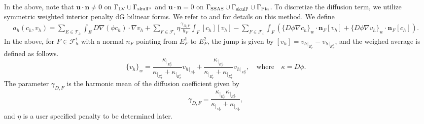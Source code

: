 \documentclass[fleqn,10pt]{wlscirep}
\begin{document}
In the above, note that $\bm u \cdot \bm n  \neq 0$ on $\Gamma_{\rm LV} \cup \Gamma_{\rm skull^u}$ and $\bm u \cdot \bm n = 0$ on $\Gamma_{\rm SSAS} \cup \Gamma_{\rm skull^l} \cup \Gamma_{\rm Pia}$. To discretize the diffusion term, we utilize symmetric weighted interior penalty dG bilinear forms. We refer to \cite{ern2009discontinuous} and \cite[Section 4.5.2.3]{di2011mathematical} for details on this method.  We define 
\begin{multline}
a_h (c_h, v_h) = \sum_{E \in \mathcal{T}_h } \int_{E} D \nabla (\phi c_h) \cdot \nabla v_h + \sum_{F \in \mathcal{F}_i} \eta \frac{\gamma_{D,F}}{h_F} \int_{F} [c_h][v_h] 
- \sum_{F \in \mathcal{F}_i} \int_{F} \left( \{D \phi \nabla c_h \}_w \cdot \bm n_F [v_h]  + \{D \phi\nabla v_h \}_w \cdot \bm n_F [c_h] \right).
 \nonumber
 \end{multline}
In the above, for $F\in \mathcal{F}_h^i$ with a normal $n_F$ pointing from $E_F^1$ to $E_F^2$,  the jump is given by $[v_h] = v_h{}_{\vert_{E_F^1}} - v_h{}_{\vert_{E_{F}^2}}$, and the weighed average is defined as follows.
\begin{equation}
\{v_h\}_{w} = \frac{ \kappa_{\vert_{E_F^2}}}{\kappa_{\vert_{E_F^1}}+ \kappa_{\vert_{E_F^2}}} v_h{}_{\vert_{E_{F}^1}} + \frac{\kappa_{\vert_{E_F^1}}}{\kappa_{ \vert_{E_F^1}}+ \kappa_{\vert_{E_F^2}}} v_h{}_{\vert_{E_{F}^2}}, \quad \text{where} \quad \kappa = D \phi.  
\end{equation}
The parameter $\gamma_{D,F}$ is the harmonic mean of the diffusion coefficient given by 
$$
\gamma_{D,F} = \frac{ \kappa_{\vert_{E_F^1}}\kappa_{\vert_{E_F^2}}}{\kappa_{\vert_{E_F^1}}+ \kappa_{\vert_{E_F^2}}},
$$
and $\eta$ is a user specified penalty to be determined later. 
\end{document}
